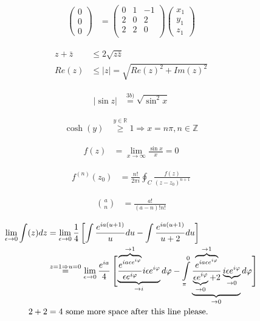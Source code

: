\documentclass[12pt, a4paper, twopage]{scrartcl}
\newcommand{\limz}[1]{\lim\limits_{#1 \rightarrow 0}}
\begin{document}
\begin{align}
	 \begin{pmatrix}
	 0\\0\\0
	 \end{pmatrix} &= \begin{pmatrix}
	 0 & 1 & -1 \\
	 2 & 0 & 2\\
	 2 & 2 & 0\\
	 \end{pmatrix} \begin{pmatrix}
	 x_1 \\ y_1\\ z_1
	 \end{pmatrix}
\end{align}


\begin{align}
	 z + \bar{z} &\leq 2\sqrt{z\bar{z}} \tag*{:2} \\\nonumber	 
	 Re(z) &\leq |z| = \sqrt{Re(z)^2 + Im(z)^2} \tag*{$\square$}
\end{align}


\begin{align}
	 |\sin z| &\overset{3b)}= \sqrt{\sin^2 x}
\end{align}


\begin{align}
	 \cosh(y) & \overset{y \in \mathbb{R}} \geq 1 \Rightarrow x = n \pi, n \in \mathbb{Z}
\end{align}
	
	
\begin{align}
	 f(z) &= \lim\limits_{x\rightarrow \infty} \frac{\sin x}{x} = 0
\end{align}


\begin{align}
	 f^{(n)} (z_0) &= \frac{n!}{2\pi i} \oint_C  \frac{f(z)}{(z - z_0)^{n + 1}}
\end{align}


\begin{align}
	 \binom{a}{n} &= \frac{a!}{(a-n)! n!}
\end{align}


\begin{align}
	 \nonumber \limz{\epsilon}\int(z) dz &= \limz{\epsilon} \frac14 \left[ \int\frac{e^{ia(u + 1)}}{u} du - \int\frac{e^{ia(u + 1)}}{u + 2}du   \right]\\[1em]
	 & \overset{z = 1 \Rightarrow u = 0}= \limz{\epsilon} \frac{e^{i a}}{4} \left[\vphantom{ \int\limits_{\pi}^0} \smash{ \underbrace{\frac{\overbrace{e^{ia \epsilon e^{i \varphi}}}^{\rightarrow 1}} {\epsilon e^{i \varphi}} i \epsilon e^{i \varphi}}_{\rightarrow i}  d \varphi            - \int\limits_{\pi}^0 \underbrace{\frac{\overbrace{e^{ia \epsilon e^{i \varphi}}}^{\rightarrow 1}} {\underbrace{\epsilon e^{i \varphi}}_{\rightarrow 0} + 2} \underbrace{i \epsilon e^{i \varphi}}_{\rightarrow 0}}_{\rightarrow 0}  d \varphi  }\right]\\[2em]
	 2 + 2 &= 4 \ \text{some more space after this line please.}\\[4em]\nonumber
\end{align}
\end{document}
